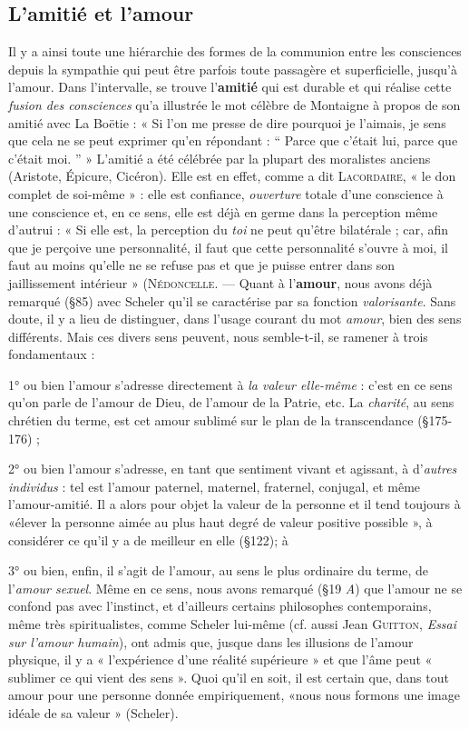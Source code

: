 \subsection{L’amitié et l’amour}
Il y a ainsi toute une hiérarchie des
formes de la communion entre les consciences depuis la sympathie
qui peut être parfois toute passagère et superficielle, jusqu’à l’amour.
Dans l'intervalle, se trouve l’{\bf amitié} qui est durable et qui réalise cette
{\it fusion des consciences} qu’a illustrée le mot célèbre de Montaigne à
propos de son amitié avec La Boëtie : « Si l’on me presse de dire pourquoi
je l’aimais, je sens que cela ne se peut exprimer qu’en répondant :
“ Parce que c’était lui, parce que c'était moi. ” » L'amitié a été célébrée
par la plupart des moralistes anciens (Aristote, Épicure, Cicéron).
Elle est en effet, comme a dit \textsc{Lacordaire}, « le don complet de soi-même » : elle est confiance, {\it ouverture} totale d’une conscience à une
conscience et, en ce sens, elle est déjà en germe dans la perception
même d’autrui : « Si elle est, la perception du {\it toi} ne peut qu'être
bilatérale ; car, afin que je perçoive une personnalité, il faut que
cette personnalité s’ouvre à moi, il faut au moins qu’elle ne se refuse
pas et que je puisse entrer dans son jaillissement intérieur »
(\textsc{Nédoncelle}. — Quant à l’{\bf amour}, nous avons déjà remarqué (\S 85)
avec Scheler qu’il se caractérise par sa fonction {\it valorisante}. Sans
doute, il y a lieu de distinguer, dans l’usage courant du mot {\it amour},
bien des sens différents. Mais ces divers sens peuvent, nous semble-t-il,
se ramener à trois fondamentaux :

1° ou bien l’amour s’adresse directement à {\it la valeur elle-même} :
c’est en ce sens qu’on parle de l’amour de Dieu, de l’amour de la
Patrie, etc. La {\it charité}, au sens chrétien du terme, est cet amour
sublimé sur le plan de la transcendance (\S 175-176) ;

2° ou bien l’amour s’adresse, en tant que sentiment vivant et
agissant, à d’{\it autres individus} : tel est l'amour paternel, maternel,
fraternel, conjugal, et même l’amour-amitié. Il a alors pour objet la
valeur de la personne et il tend toujours à «élever la personne aimée
au plus haut degré de valeur positive possible », à considérer ce qu’il
y a de meilleur en elle (\S 122); à

3° ou bien, enfin, il s’agit de l’amour, au sens le plus ordinaire du
terme, de l'{\it amour sexuel}. Même en ce sens, nous avons remarqué
(\S 19 {\it A}) que l’amour ne se confond pas avec l'instinct, et d’ailleurs
certains philosophes contemporains, même très spiritualistes, comme
Scheler lui-même (cf. aussi Jean \textsc{Guitton}, {\it Essai sur l'amour humain}),
ont admis que, jusque dans les illusions de l’amour physique, il y a
« l'expérience d’une réalité supérieure » et que l’âme peut « sublimer
ce qui vient des sens ». Quoi qu’il en soit, il est certain que, dans tout
amour pour une personne donnée empiriquement, «nous nous formons
une image idéale de sa valeur » (Scheler).

